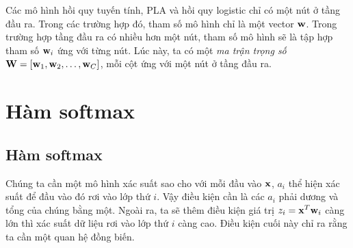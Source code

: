 


Các mô hình hồi quy tuyến tính, PLA và hồi quy logistic chỉ có một nút ở tầng
đầu ra. Trong các trường hợp đó, tham số mô hình chỉ là một vector $\mathbf{w}$.
Trong trường hợp tầng đầu ra có nhiều hơn một nút, tham số mô hình sẽ là tập hợp
tham số $\mathbf{w}_i$ ứng với từng nút. Lúc này, ta có một \textit{ma trận
trọng số} $\mathbf{W} = [\mathbf{w}_1, \mathbf{w}_2, \dots, \mathbf{w}_C]$, mỗi
cột ứng với một nút ở tầng đầu ra.


\section{Hàm softmax}
\subsection{Hàm softmax}

Chúng ta cần một mô hình xác suất sao cho với mỗi đầu vào $\mathbf{x}$, $a_i$ thể hiện
xác suất để đầu vào đó rơi vào lớp thứ $i$. Vậy điều kiện cần là các $a_i$ phải
dương và tổng của chúng bằng một. Ngoài ra, ta sẽ thêm điều kiện giá trị $z_i =
\mathbf{x}^T\mathbf{w}_i$ càng lớn thì xác suất dữ liệu rơi vào lớp thứ $i$ càng cao. Điều
kiện cuối này chỉ ra rằng ta cần một quan hệ đồng biến.

